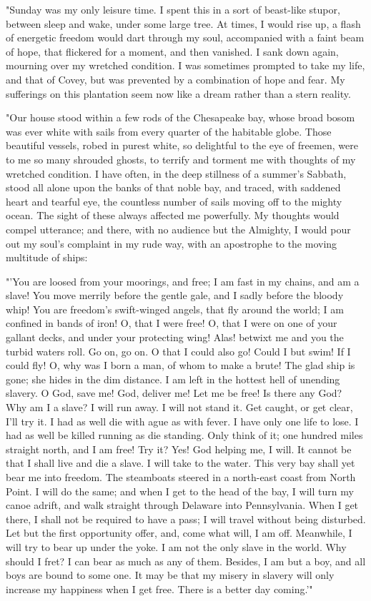 "Sunday was my only leisure time. I spent this in a sort of beast-like
stupor, between sleep and wake, under some large tree. At times, I would
rise up, a flash of energetic freedom would dart through my soul,
accompanied with a faint beam of hope, that flickered for a moment, and
then vanished. I sank down again, mourning over my wretched condition. I
was sometimes prompted to take my life, and that of Covey, but was
prevented by a combination of hope and fear. My sufferings on this
plantation seem now like a dream rather than a stern reality.

{}"Our house stood within a few rods of the Chesapeake bay, whose broad
bosom was ever white with sails from every quarter of the habitable
globe. Those beautiful vessels, robed in purest white, so delightful to
the eye of freemen, were to me so many shrouded ghosts, to terrify and
torment me with thoughts of my wretched condition. I have often, in the
deep stillness of a summer's Sabbath, stood all alone upon the banks of
that noble bay, and traced, with saddened heart and tearful eye, the
countless number of sails moving off to the mighty ocean. The sight of
these always affected me powerfully. My thoughts would compel utterance;
and there, with no audience but the Almighty, I would pour out my soul's
complaint in my rude way, with an apostrophe to the moving multitude of
ships:

{"}'You are loosed from your moorings, and free; I am fast in my chains,
and am a slave! You move merrily before the gentle gale, and I sadly
before the bloody whip! You are freedom's swift-winged angels, that fly
around the world; I am confined in bands of iron! O, that I were free!
O, that I were on one of your gallant decks, and under your protecting
wing! Alas! betwixt me and you the turbid waters roll. Go on, go on. O
that I could also go! Could I but swim! If I could fly! O, why was I
born a man, of whom to make a brute! The glad ship is gone; she hides in
the dim distance. I am left in the hottest hell of unending slavery. O
God, save me! God, deliver me! Let me be free! Is there any God? Why am
I a slave? I will run away. I will not stand it. Get caught, or get
clear, I'll try it. I had as well die with ague as with fever. I have
only one life to lose. I had as well be killed running as die standing.
Only think of it; one hundred miles straight north, and I am free! Try
it? Yes! God helping me, I will. It cannot be that I shall live and die
a slave. I will take to the water. This very bay shall yet bear me into
freedom. The steamboats steered in a north-east coast from North
{}Point. I will do the same; and when I get to the head of the bay, I
will turn my canoe adrift, and walk straight through Delaware into
Pennsylvania. When I get there, I shall not be required to have a pass;
I will travel without being disturbed. Let but the first opportunity
offer, and, come what will, I am off. Meanwhile, I will try to bear up
under the yoke. I am not the only slave in the world. Why should I fret?
I can bear as much as any of them. Besides, I am but a boy, and all boys
are bound to some one. It may be that my misery in slavery will only
increase my happiness when I get free. There is a better day coming.{'}"

